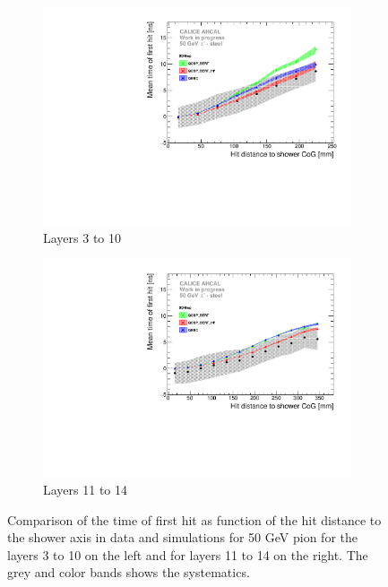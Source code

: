 \documentclass{JINST}
\begin{document}
\begin{figure}[htbp!]
  \begin{subfigure}[t]{0.49\textwidth}
    \centering
    \includegraphics[width=1\textwidth]{fig/Time_Radius_50GeV_SSF_DD4hep.pdf}
    \caption{Layers 3 to 10} \label{fig:Radius_SSF_SimData_50GeV}
  \end{subfigure}
  \hfill
  \begin{subfigure}[t]{0.49\textwidth}
    \centering
    \includegraphics[width=1\textwidth]{fig/Time_Radius_50GeV_BL_DD4hep.pdf}
    \caption{Layers 11 to 14} \label{fig:Radius_BL_SimData_50GeV}
  \end{subfigure}
  \caption{Comparison of the time of first hit as function of the hit distance to the shower axis in data and simulations for 50 GeV pion for the layers 3 to 10 on the left and for layers 11 to 14 on the right. The grey and color bands shows the systematics.}
  \label{fig:Radius_SSF_SimData_50GeVComparison}
\end{figure}
\end{document}

